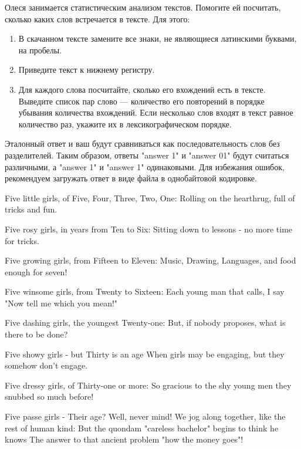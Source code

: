 
Олеся занимается статистическим анализом текстов. Помогите ей посчитать, сколько каких слов 
встречается в тексте. Для этого:

\begin{enumerate}
    \item В скачанном тексте замените все знаки, не являющиеся латинскими буквами, на пробелы.
    \item Приведите текст к нижнему регистру.
    \item Для каждого слова посчитайте, сколько его вхождений есть в тексте. Выведите список пар слово — количество его повторений в порядке убывания количества вхождений. Если несколько слов входят в текст равное количество раз, укажите их в лексикографическом порядке.
\end{enumerate}

\explanationSection

Эталонный ответ и ваш будут сравниваться как последовательность слов без разделителей. Таким образом, ответы "answer 1" и "answer 01" будут считаться различными, а "answer 1" и "answer        1" одинаковыми. Для избежания ошибок, рекомендуем загружать ответ в виде файла в однобайтовой кодировке.


\begin{myverbbox}[\small]{\vinput}
    Five little girls, of Five, Four, Three, Two, One:
    Rolling on the hearthrug, full of tricks and fun.
    
    Five rosy girls, in years from Ten to Six:
    Sitting down to lessons - no more time for tricks.
    
    Five growing girls, from Fifteen to Eleven:
    Music, Drawing, Languages, and food enough for seven!
    
    Five winsome girls, from Twenty to Sixteen:
    Each young man that calls, I say "Now tell me which you mean!"
    
    Five dashing girls, the youngest Twenty-one:
    But, if nobody proposes, what is there to be done?
    
    Five showy girls - but Thirty is an age
    When girls may be engaging, but they somehow don't engage.
    
    Five dressy girls, of Thirty-one or more:
    So gracious to the shy young men they snubbed so much before!
    
    Five passe girls - Their age? Well, never mind!
    We jog along together, like the rest of human kind:
    But the quondam "careless bachelor" begins to think he knows
    The answer to that ancient problem "how the money goes"!
\end{myverbbox}

